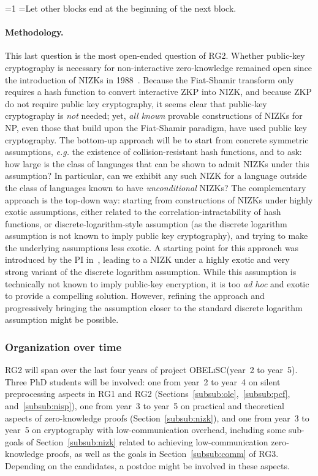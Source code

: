 \documentclass[oneside, a4paper, onecolumn, 11pt]{article}
\newcommand{\OBELiSC}{\textsc{OBELiSC}\xspace}
\newcounter{alphasect}
\def\alphainsection{0}
\newenvironment{alphasection}{%
  \ifnum\alphainsection=1%
    \errhelp={Let other blocks end at the beginning of the next block.}
    \errmessage{Nested Alpha section not allowed}
  \fi%
  \setcounter{alphasect}{0}
  \def\alphainsection{1}
}{%
  \setcounter{alphasect}{0}
  \def\alphainsection{0}
}%
\begin{document}
\begin{alphasection}
\paragraph{Methodology.} This last question is the most open-ended question of RG2. Whether public-key cryptography is necessary for non-interactive zero-knowledge remained open since the introduction of NIZKs in 1988~\cite{STOC:BluFelMic88}. Because the Fiat-Shamir transform only requires a hash function to convert interactive ZKP into NIZK, and because ZKP do not require public key cryptography, it seems clear that public-key cryptography is \emph{not} needed; yet, \emph{all known} provable constructions of NIZKs for NP, even those that build upon the Fiat-Shamir paradigm, have used public key cryptography. The bottom-up approach will be to start from concrete symmetric assumptions, \emph{e.g.} the existence of collision-resistant hash functions, and to ask: how large is the class of languages that can be shown to admit NIZKs under this assumption? In particular, can we exhibit any such NIZK for a language outside the class of languages known to have \emph{unconditional} NIZKs? The complementary approach is the top-down way: starting from constructions of NIZKs under highly exotic assumptions, either related to the correlation-intractability of hash functions, or discrete-logarithm-style assumption (as the discrete logarithm assumption is not known to imply public key cryptography), and trying to make the underlying assumptions less exotic. A starting point for this approach was introduced by the PI in~\cite{EC:CouKatUrs20}, leading to a NIZK under a highly exotic and very strong variant of the discrete logarithm assumption. While this assumption is technically not known to imply public-key encryption, it is too \emph{ad hoc} and exotic to provide a compelling solution. However, refining the approach and progressively bringing the assumption closer to the standard discrete logarithm assumption might be possible.

\subsubsection{Organization over time}

RG2 will span over the last four years of project \OBELiSC (year~2 to year~5). Three PhD students will be involved: one from year~2 to year~4 on silent preprocessing aspects in RG1 and RG2 (Sections~\ref{subsub:ole},~\ref{subsub:pcf}, and~\ref{subsub:nisp}), one from year~3 to year~5 on practical and theoretical aspects of zero-knowledge proofs (Section~\ref{subsub:nizk}), and one from year~3 to year~5 on cryptography with low-communication overhead, including some sub-goals of Section~\ref{subsub:nizk} related to achieving low-communication zero-knowledge proofs, as well as the goals in Section~\ref{subsub:comm} of RG3. Depending on the candidates, a postdoc might be involved in these aspects.


\end{alphasection}
\end{document}
